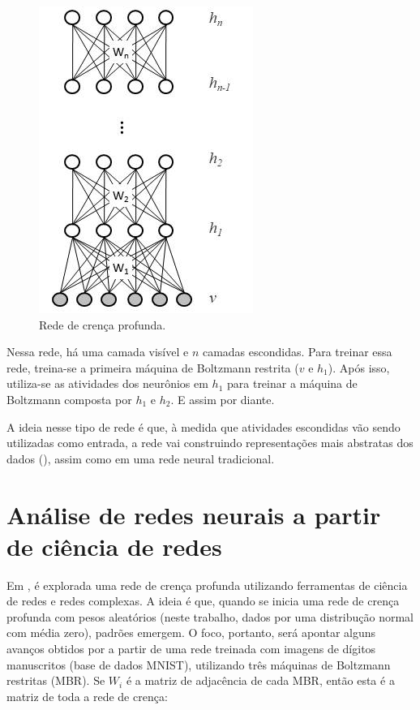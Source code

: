 \documentclass{article}
\begin{document}
            \begin{figure}[h!]
                \centering
                \includegraphics[scale=0.5]{Images/Deep belief network.png}
                \caption{Rede de crença profunda.}
                \label{fig4}
            \end{figure}

            Nessa rede, há uma camada visível e $n$ camadas escondidas.
            Para treinar essa rede, treina-se a primeira máquina de Boltzmann restrita ($v$ e $h_1$).
            Após isso, utiliza-se as atividades dos neurônios em $h_1$ para treinar a máquina de Boltzmann composta por $h_1$ e $h_2$.
            E assim por diante.

            A ideia nesse tipo de rede é que, à medida que atividades escondidas vão sendo utilizadas como entrada, a rede vai construindo representações mais abstratas dos dados (\cite{testolin2018deep}), assim como em uma rede neural tradicional.

    \section{Análise de redes neurais a partir de ciência de redes}
        \label{analysis}

        Em \cite{testolin2018deep}, é explorada uma rede de crença profunda utilizando ferramentas de ciência de redes e redes complexas.
        A ideia é que, quando se inicia uma rede de crença profunda com pesos aleatórios (neste trabalho, dados por uma distribução normal com média zero), padrões emergem.
        O foco, portanto, será apontar alguns avanços obtidos por \cite{testolin2018deep} a partir de uma rede treinada com imagens de dígitos manuscritos (base de dados MNIST), utilizando três máquinas de Boltzmann restritas (MBR).
        Se $W_i$ é a matriz de adjacência de cada MBR, então esta é a matriz de toda a rede de crença:
\end{document}
